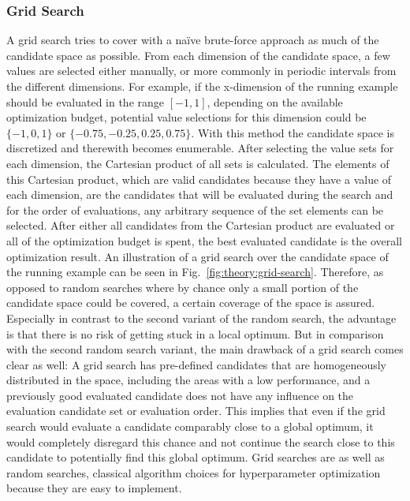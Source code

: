 \subsubsection{Grid Search}
\label{sec:theory:optimization:search:grid}
A grid search tries to cover with a na\"ive brute-force approach as much of the candidate space as possible.
From each dimension of the candidate space, a few values are selected either manually, or more commonly in periodic intervals from the different dimensions.
For example, if the x-dimension of the running example should be evaluated in the range $[-1,1]$, depending on the available optimization budget, potential value selections for this dimension could be $\{-1,0,1\}$ or $\{-0.75,-0.25,0.25,0.75\}$.
With this method the candidate space is discretized and therewith becomes enumerable.\newline
After selecting the value sets for each dimension, the Cartesian product of all sets is calculated.
The elements of this Cartesian product, which are valid candidates because they have a value of each dimension, are the candidates that will be evaluated during the search and for the order of evaluations, any arbitrary sequence of the set elements can be selected.
After either all candidates from the Cartesian product are evaluated or all of the optimization budget is spent, the best evaluated candidate is the overall optimization result.
An illustration of a grid search over the candidate space of the running example can be seen in Fig.~\ref{fig:theory:grid-search}.\newline
Therefore, as opposed to random searches where by chance only a small portion of the candidate space could be covered, a certain coverage of the space is assured.
Especially in contrast to the second variant of the random search, the advantage is that there is no risk of getting stuck in a local optimum.
But in comparison with the second random search variant, the main drawback of a grid search comes clear as well: A grid search has pre-defined candidates that are homogeneously distributed in the space, including the areas with a low performance, and a previously good evaluated candidate does not have any influence on the evaluation candidate set or evaluation order.
This implies that even if the grid search would evaluate a candidate comparably close to a global optimum, it would completely disregard this chance and not continue the search close to this candidate to potentially find this global optimum.\newline
Grid searches are as well as random searches, classical algorithm choices for hyperparameter optimization because they are easy to implement.
